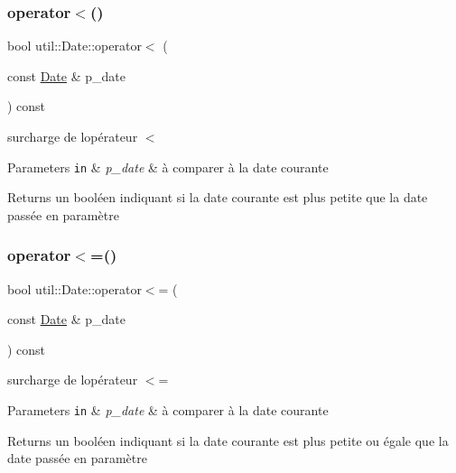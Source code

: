 \subsubsection{\texorpdfstring{operator$<$()}{operator<()}}
{\footnotesize\ttfamily bool util\+::\+Date\+::operator$<$ (\begin{DoxyParamCaption}\item[{const \hyperlink{classutil_1_1Date}{Date} \&}]{p\+\_\+date }\end{DoxyParamCaption}) const}



surcharge de l\textquotesingle{}opérateur $<$ 


\begin{DoxyParams}[1]{Parameters}
\mbox{\tt in}  & {\em p\+\_\+date} & à comparer à la date courante \\
\hline
\end{DoxyParams}
\begin{DoxyReturn}{Returns}
un booléen indiquant si la date courante est plus petite que la date passée en paramètre 
\end{DoxyReturn}
\mbox{\label{classutil_1_1Date_af65a0fddef5326badc11d48d1dd253cd}} 
\subsubsection{\texorpdfstring{operator$<$=()}{operator<=()}}
{\footnotesize\ttfamily bool util\+::\+Date\+::operator$<$= (\begin{DoxyParamCaption}\item[{const \hyperlink{classutil_1_1Date}{Date} \&}]{p\+\_\+date }\end{DoxyParamCaption}) const}



surcharge de l\textquotesingle{}opérateur $<$= 


\begin{DoxyParams}[1]{Parameters}
\mbox{\tt in}  & {\em p\+\_\+date} & à comparer à la date courante \\
\hline
\end{DoxyParams}
\begin{DoxyReturn}{Returns}
un booléen indiquant si la date courante est plus petite ou égale que la date passée en paramètre 
\end{DoxyReturn}
\mbox{\label{classutil_1_1Date_a8114f8e40cee24e1d7a58b910e8f4637}} 
